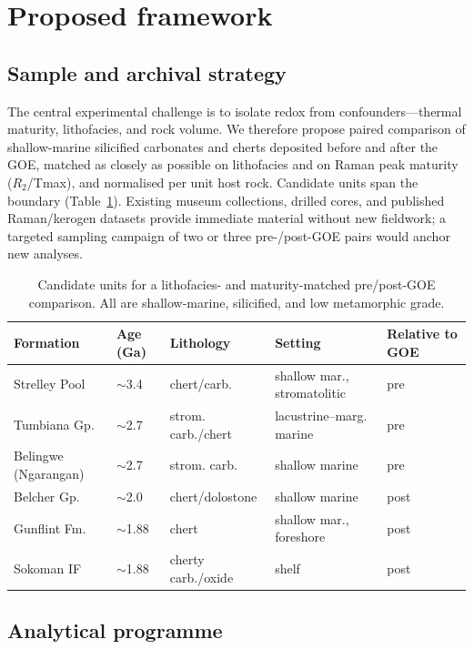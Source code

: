 \documentclass[11pt]{article}
\begin{document}
\section{Proposed framework}\label{sec:frame}

\subsection{Sample and archival strategy}

The central experimental challenge is to isolate redox from confounders---thermal maturity,
lithofacies, and rock volume. We therefore propose paired comparison of shallow-marine
silicified carbonates and cherts deposited before and after the GOE, matched as closely as possible
on lithofacies and on Raman peak maturity ($R_2$/Tmax), and normalised per unit host rock. Candidate
units span the boundary (Table~\ref{tab:forms}). Existing museum collections, drilled cores, and
published Raman/kerogen datasets provide immediate material without new fieldwork; a targeted
sampling campaign of two or three pre-/post-GOE pairs would anchor new analyses.

\begin{table}[t]
\centering\small
\caption{Candidate units for a lithofacies- and maturity-matched pre/post-GOE comparison. All are
shallow-marine, silicified, and low metamorphic grade.}
\label{tab:forms}
\begin{tabular}{lllll}
\toprule
Formation & Age (Ga) & Lithology & Setting & Relative to GOE \\
\midrule
Strelley Pool & $\sim$3.4 & chert/carb. & shallow mar., stromatolitic & pre \\
Tumbiana Gp. & $\sim$2.7 & strom. carb./chert & lacustrine--marg. marine & pre \\
Belingwe (Ngarangan) & $\sim$2.7 & strom. carb. & shallow marine & pre \\
\midrule
Belcher Gp. & $\sim$2.0 & chert/dolostone & shallow marine & post \\
Gunflint Fm. & $\sim$1.88 & chert & shallow mar., foreshore & post \\
Sokoman IF & $\sim$1.88 & cherty carb./oxide & shelf & post \\
\bottomrule
\end{tabular}
\end{table}

\subsection{Analytical programme}
\end{document}

